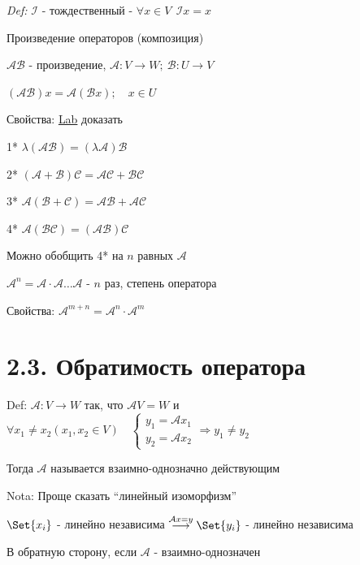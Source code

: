 \documentclass[12pt]{article}
\begin{document}
    \textit{Def:} $\mathcal{I}$ - тождественный - $\forall x \in V \ \ \mathcal{I}x = x$



    \Def Произведение операторов (композиция)

    $\mathcal{A}\mathcal{B}$ - произведение, $\mathcal{A} : V \rightarrow W; \ \mathcal{B} : U \rightarrow V$

    $(\mathcal{A}\mathcal{B}) x = \mathcal{A}(\mathcal{B}x); \quad x \in U$

    Свойства: \underline{Lab} доказать

    1* $\lambda (\mathcal{A}\mathcal{B}) = (\lambda \mathcal{A})\mathcal{B}$

    2* $(\mathcal{A} + \mathcal{B}) \mathcal{C} = \mathcal{A}\mathcal{C} + \mathcal{B}\mathcal{C}$

    3* $\mathcal{A} (\mathcal{B} + \mathcal{C}) = \mathcal{A}\mathcal{B} + \mathcal{A}\mathcal{C}$

    4* $\mathcal{A} (\mathcal{B}\mathcal{C}) = (\mathcal{A}\mathcal{B}) \mathcal{C}$


    \Nota Можно обобщить 4* на $n$ равных $\mathcal{A}$

    \Def $\mathcal{A}^n = \mathcal{A} \cdot \mathcal{A} \dots \mathcal{A}$ - $n$ раз, степень оператора

    Свойства: $\mathcal{A}^{m + n} = \mathcal{A}^n \cdot \mathcal{A}^m$

    \section{2.3. Обратимость оператора}

    Def: $\mathcal{A} : V \rightarrow W$ так, что $\mathcal{A}V = W$ и $\forall x_1 \neq x_2 (x_1, x_2 \in V) \quad
    \begin{cases}y_1 = \mathcal{A}x_1 \\ y_2 = \mathcal{A}x_2\end{cases} \Longrightarrow y_1 \neq y_2$

    Тогда $\mathcal{A}$ называется взаимно-однозначно действующим

    Nota: Проще сказать \enquote{линейный изоморфизм}

    \Th $\Set{x_i}$ - линейно независима $\stackrel{\mathcal{A}x = y}{\longrightarrow} \Set{y_i}$ - линейно независима

    В обратную сторону, если $\mathcal{A}$ - взаимно-однозначен
\end{document}

